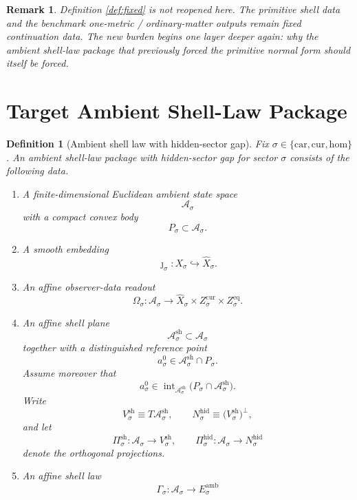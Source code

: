 \documentclass[11pt]{article}
\newcommand{\Car}{\mathrm{car}}
\newcommand{\Cur}{\mathrm{cur}}
\newcommand{\Hom}{\mathrm{hom}}
\newcommand{\VisibleAffine}[1]{\widehat X_{#1}}
\newcommand{\AmbientSpace}[1]{\mathcal A_{#1}}
\newcommand{\AmbientBody}[1]{P_{#1}}
\newcommand{\AmbientRead}[1]{\Omega_{#1}}
\newcommand{\AmbientShellLaw}[1]{\Gamma_{#1}}
\newcommand{\ShellAffine}[1]{\mathcal A_{#1}^{\mathrm{sh}}}
\newcommand{\ShellVector}[1]{V_{#1}^{\mathrm{sh}}}
\newcommand{\HiddenSpace}[1]{N_{#1}^{\mathrm{hid}}}
\newcommand{\ShellProj}[1]{\Pi_{#1}^{\mathrm{sh}}}
\newcommand{\HiddenProj}[1]{\Pi_{#1}^{\mathrm{hid}}}
\newcommand{\AmbientRef}[1]{a_{#1}^{0}}
\newcommand{\AmbientTarget}[1]{E_{#1}^{\mathrm{amb}}}
\newtheorem{definition}{Definition}
\newtheorem{remark}{Remark}
\begin{document}
\begin{remark}
Definition \ref{def:fixed} is not reopened here. The primitive shell data and the benchmark one-metric / ordinary-matter outputs remain fixed continuation data. The new burden begins one layer deeper again: why the ambient shell-law package that previously forced the primitive normal form should itself be forced.
\end{remark}

\section{Target Ambient Shell-Law Package}

\begin{definition}[Ambient shell law with hidden-sector gap]
\label{def:ambient}
Fix \(\sigma\in\{\Car,\Cur,\Hom\}\). An \emph{ambient shell-law package with hidden-sector gap} for sector \(\sigma\) consists of the following data.
\begin{enumerate}
    \item A finite-dimensional Euclidean ambient state space
    \[
    \AmbientSpace{\sigma}
    \]
    with a compact convex body
    \[
    \AmbientBody{\sigma}\subset \AmbientSpace{\sigma}.
    \]
    \item A smooth embedding
    \[
    \jmath_{\sigma}:X_{\sigma}\hookrightarrow \VisibleAffine{\sigma}.
    \]
    \item An affine observer-data readout
    \[
    \AmbientRead{\sigma}:\AmbientSpace{\sigma}\to
    \VisibleAffine{\sigma}\times Z_{\sigma}^{\mathrm{cur}}\times Z_{\sigma}^{\mathrm{eq}}.
    \]
    \item An affine shell plane
    \[
    \ShellAffine{\sigma}\subset \AmbientSpace{\sigma}
    \]
    together with a distinguished reference point
    \[
    \AmbientRef{\sigma}\in \ShellAffine{\sigma}\cap \AmbientBody{\sigma}.
    \]
    Assume moreover that
    \[
    \AmbientRef{\sigma}\in
    \operatorname{int}_{\ShellAffine{\sigma}}
    \bigl(\AmbientBody{\sigma}\cap \ShellAffine{\sigma}\bigr).
    \]
    Write
    \[
    \ShellVector{\sigma}\equiv T\ShellAffine{\sigma},
    \qquad
    \HiddenSpace{\sigma}\equiv \bigl(\ShellVector{\sigma}\bigr)^{\perp},
    \]
    and let
    \[
    \ShellProj{\sigma}:\AmbientSpace{\sigma}\to \ShellVector{\sigma},
    \qquad
    \HiddenProj{\sigma}:\AmbientSpace{\sigma}\to \HiddenSpace{\sigma}
    \]
    denote the orthogonal projections.
    \item An affine shell law
    \[
    \AmbientShellLaw{\sigma}:\AmbientSpace{\sigma}\to \AmbientTarget{\sigma}
\]
\end{enumerate}
\end{definition}
\end{document}
